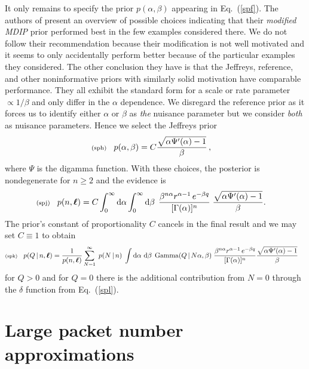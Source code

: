 \documentclass[11pt]{article}
\newcommand{\lleq}[1]{\label{#1} }
\renewcommand{\lleq}[1]{\label{#1} {\scriptstyle {\rm (#1)}} \hspace*{2ex} }
\newcommand{\cond}{\,|\,}
\newcommand{\refeq}[1]{Eq.~(\ref{#1})}
\DeclareMathOperator{\GammaDist}{Gamma}
\newcommand{\rmdx}[1]{\dd{#1}} %
\begin{document}
It only remains to specify the prior $p(\alpha,\beta)$ appearing in
\refeq{spf}.
%
The authors of \cite{moala2013bayesian} present an overview of
possible choices indicating that their \emph{modified MDIP} prior
performed best in the few examples considered there. We do not follow
their recommendation because their modification is not well motivated
and it seems to only accidentally perform better because of the
particular examples they considered. The other conclusion they have is
that the Jeffreys, reference, and other noninformative priors with
similarly solid motivation have comparable performance. They all
exhibit the standard form for a scale or rate parameter
$\propto 1/\beta$ and only differ in the $\alpha$ dependence. We
disregard the reference prior as it forces us to identify either
$\alpha$ or $\beta$ as \emph{the} nuisance parameter but we consider
\emph{both} as nuisance parameters. Hence we select the Jeffreys prior
\begin{align}
  \lleq{sph}
  p(\alpha,\beta)
  &=  C \frac{\sqrt{\alpha \Psi'(\alpha)-1}}{\beta} \, ,
\end{align}
where $\Psi$ is the digamma function. With these choices, the
posterior is nondegenerate for $n \geq 2$ and the evidence is
\begin{align}
  \lleq{spj}
  p(n, \bml) &= C \int_0^{\infty} \rmdx{\alpha} \int_0^{\infty} \rmdx{\beta}\;
  \frac{\beta^{n\alpha} r^{\alpha-1}\,e^{-\beta q}}{[\Gamma(\alpha)]^n}\;
  \frac{\sqrt{\alpha \Psi'(\alpha)-1}}{\beta}.
\end{align}
The prior's constant of proportionality $C$ cancels in the final
result and we may set $C\equiv 1$ to obtain
\begin{align}
  \lleq{spk}
  p(Q\cond n,\bml)
  &= \frac{1}{p(n, \bml)}
    \sum_{N=1}^\infty \;
    p(N\cond n)\;
    \int \rmdx{\alpha}\,\rmdx{\beta}\;
    \GammaDist(Q\cond N\alpha, \beta)\;
    \frac{\beta^{n\alpha} r^{\alpha-1}\,e^{-\beta q}}{[\Gamma(\alpha)]^n} \frac{\sqrt{\alpha \Psi'(\alpha)-1}}{\beta}
\end{align}
for $Q > 0$ and for $Q=0$ there is the additional contribution from
$N=0$ through the $\delta$ function from \refeq{spl}.

\section{Large packet number approximations} \label{sec:asymptotic}
\end{document}
